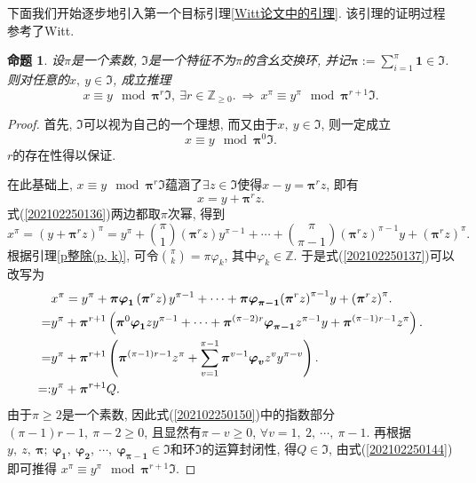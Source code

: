 \documentclass[UTF8, twoside]{ctexart}
\theoremstyle{nonumberplain}
\newtheorem{proof}{\heiti 证明}  %
\theoremstyle{nonumberplain}
\theoremstyle{plain}
\newtheorem{mingti4}[dingyi4]{命题}
\begin{document}
	下面我们开始逐步地引入第一个目标引理\ref{Witt论文中的引理}. 该引理的证明过程参考了Witt\cite[Lemma]{Witt}.
	\begin{mingti4} \label{202102250210}
		设$\pi $是一个素数, $\Im $是一个特征不为$\pi $的含幺交换环, 并记$\bm{\pi} :=\sum_{i=1}^{\pi }{\bm{1}\in \Im }$. 则对任意的$x,\ y\in \Im $, 成立推理
		\[
			x\equiv y\ \bmod {\bm{\pi }^{r}}\Im ,
			\ \exists r\in {{\mathbb{Z}}_{\ge 0}}.
			\ \Longrightarrow \ 
			{{x}^{\pi }}\equiv {{y}^{\pi }}
			\ \bmod {\bm{\pi }^{r+1}}\Im .
		\]
	\end{mingti4}
	\begin{proof}
		首先, $\Im $可以视为自己的一个理想, 而又由于$x,\ y\in \Im $, 则一定成立
		\[
			x\equiv y\ \bmod {\bm{\pi }^{0}}\Im .
		\]
		$r$的存在性得以保证. 
		
		在此基础上, $x\equiv y\ \bmod {\bm{\pi }^{r}}\Im $蕴涵了$\exists z\in \Im $使得$x-y={\bm{\pi }^{r}}z$, 即有
		\begin{equation} \label{202102250136}
			x=y+{\bm{\pi }^{r}}z.
		\end{equation}
		式(\ref{202102250136})两边都取$\pi $次幂, 得到
		\begin{equation} \label{202102250137}
			{{x}^{\pi }}={{\left( y+{\bm{\pi }^{r}}z \right)}^{\pi }}={{y}^{\pi }}+\binom{\pi}{1}\left( {\bm{\pi }^{r}}z \right){{y}^{\pi -1}}+\cdots +
			\binom{\pi}{\pi-1}
			{{\left( {\bm{\pi }^{r}}z \right)}^{\pi -1}}y+{{\left( {\bm{\pi }^{r}}z \right)}^{\pi }}.
		\end{equation}
		根据引理\ref{p整除(p, k)}, 可令$\binom{\pi}{k}
		=\pi {{\varphi }_{k}}$, 其中${{\varphi }_{k}}\in \mathbb{Z}$. 于是式(\ref{202102250137})可以改写为
		\begin{align}
			& {{x}^{\pi }}={{y}^{\pi }}+\bm{\pi} \bm{{\varphi }_{1}}\left( {\bm{\pi }^{r}}z \right){{y}^{\pi -1}}+\cdots +\bm{\pi} \bm{{\varphi }_{\pi -1}}{{\left( {\bm{\pi }^{r}}z \right)}^{\pi -1}}y+{{\left( {\bm{\pi }^{r}}z \right)}^{\pi }}. \notag\\ 
			=&{{y}^{\pi }}+{\bm{\pi }^{r+1}}\left( {\bm{\pi }^{0}}\bm{{\varphi }_{1}}z{{y}^{\pi -1}}+\cdots +{\bm{\pi }^{\left( \pi -2 \right)r}}\bm{{\varphi }_{\pi -1}}{{z}^{\pi -1}}y+{\bm{\pi }^{\left( \pi -1 \right)r-1}}{{z}^{\pi }} \right). \notag\\ 
			=&{{y}^{\pi }}+{\bm{\pi }^{r+1}}\left( {\bm{\pi }^{\left( \pi -1 \right)r-1}}{{z}^{\pi }}+\sum\limits_{v=1}^{\pi -1}{{\bm{\pi }^{v-1}}\bm{{\varphi }_{v}}}{{z}^{v}}{{y}^{\pi -v}} \right). 
			\label{202102250150}\\ 
			=:&{{y}^{\pi }}+{\bm{\pi }^{r+1}}Q. 
			\label{202102250144}
		\end{align}
		由于$\pi \ge 2$是一个素数, 因此式(\ref{202102250150})中的指数部分$\left( \pi -1 \right)r-1,\ \pi -2\ge 0$, 且显然有$\pi -v\ge 0$, $\forall v=1,\ 2,\ \cdots ,\ \pi -1$.
		再根据$y,\ z,\ \bm{\pi};\ \bm{{\varphi }_{1}},\ \bm{{\varphi }_{2}},\ \cdots,\ \bm{{\varphi }_{\pi -1}}\in \Im $和环$\Im $的运算封闭性, 得$Q\in \Im $, 由式(\ref{202102250144})即可推得
		${{x}^{\pi }}\equiv {{y}^{\pi }}\ \bmod {\bm{\pi }^{r+1}}\Im $. 
	\end{proof}
\end{document}
